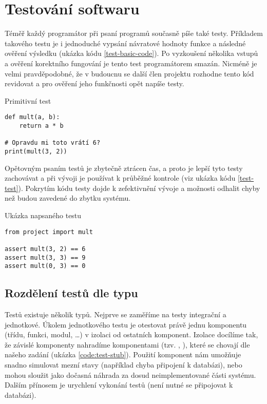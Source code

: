 \section{Testování softwaru}

Téměř každý programátor při psaní programů současně píše také testy.
Příkladem takového testu je i jednoduché vypsání návratové hodnoty funkce a následné ověření výsledku (ukázka kódu \ref{test-basic-code}).
Po vyzkoušení několika vstupů a ověření korektního fungování je tento test programátorem smazán.
Nicméně je velmi pravděpodobné, že v budoucnu se další člen projektu rozhodne tento kód revidovat a pro ověření jeho funkčnosti opět napíše testy.

\begin{listing}[ht]
\caption{\label{test-basic-code}Primitivní test}
\begin{verbatim}
def mult(a, b):
    return a * b

# Opravdu mi toto vrátí 6?
print(mult(3, 2))
\end{verbatim}
\end{listing}

Opětovným psaním testů je zbytečně ztrácen čas, a proto je lepší tyto testy zachovávat a při vývoji je používat k průběžné kontrole (viz ukázka kódu \ref{test-test}).
Pokrytím kódu testy dojde k zefektivnění vývoje a možnosti odhalit chyby než budou zavedené do zbytku systému.

\begin{listing}[ht]
\caption{\label{test-test}Ukázka napsaného testu}
\begin{verbatim}
from project import mult

assert mult(3, 2) == 6
assert mult(3, 3) == 9
assert mult(0, 3) == 0
\end{verbatim}
\end{listing}

\subsection{Rozdělení testů dle typu}

Testů existuje několik typů.
Nejprve se zaměříme na testy integrační a jednotkové.
Úkolem jednotkového testu je otestovat právě jednu komponentu (třídu, funkci, modul, \ldots) v izolaci od ostatních komponent.
Izolace docílíme tak, že závislé komponenty nahradíme komponentami  (tzv. ,  \cite{fowler_mocks}), které se chovají  dle našeho zadání (ukázka \ref{code:test-stub}).
Použití  komponent nám umožňuje snadno simulovat mezní stavy (například chyba připojení k databázi), nebo mohou sloužit jako dočasná náhrada za dosud neimplementované části systému.
Dalším přínosem je urychlení vykonání testů (není nutné se připojovat k databázi).

